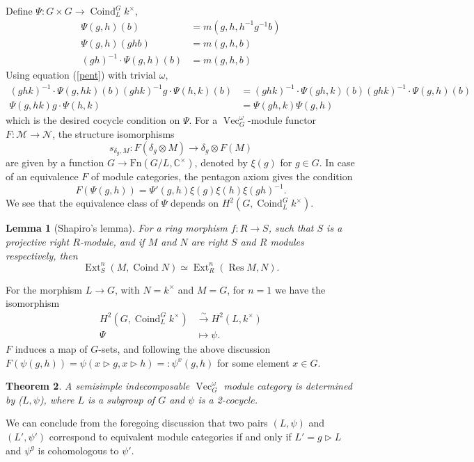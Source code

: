 \documentclass[11pt]{book}
\newtheorem{theorem}{Theorem}[section]
\newtheorem{Lem}[theorem]{Lemma}
\theoremstyle{Rem}
\theoremstyle{definition}
\numberwithin{equation}{section}
\newcommand\hit{\triangleright}
\newcommand\inv{^{-1}}
\newcommand\ot{\otimes}
\newcommand\Res{\operatorname{Res}}
\newcommand\Coind{\operatorname{Coind}}
\newcommand\Vect{\operatorname{Vec}}
\newcommand\Ext{\operatorname{Ext}}
\newcommand\kk{\mathbb C}
\newcommand\M{\mathcal{M}}
\newcommand\NN{\mathcal{N}}
\newcommand{\ra}\rightarrow
\begin{document}
Define $\Psi: G\times G \rightarrow \Coind^G_L k^\times$, 
\begin{align}
	\Psi(g,h)(b) &= m(g, h, h\inv g\inv b) \\
	\Psi(g,h)(ghb) &=  m(g, h, b)\\
	(gh)\inv\cdot\Psi (g,h)(b) &= m(g,h,b)
\end{align}
Using equation (\ref{pent}) with trivial $\omega$,
\begin{align}
	(ghk)\inv\cdot \Psi(g, hk)(b)(ghk)\inv g\cdot \Psi(h, k)( b) &=  (ghk)\inv\cdot \Psi(gh, k)( b)(ghk)\inv \cdot \Psi(g, h)(b)\\
 \Psi(g, hk)g\cdot \Psi(h, k) &=   \Psi(gh, k) \Psi(g, h)
\end{align}
which is the desired cocycle condition on $\Psi$. For a $\Vect^\omega_G$-module functor $F:\M\ra \NN$, the structure isomorphisms \begin{equation}
	s_{\delta_g, M}: F(\delta_g \ot M)\ra \delta_g\ot F(M)
\end{equation} are given by a function $G\ra \text{Fn} (G/L, \kk^\times)$, denoted by $\xi(g)$ for $g\in G$. In case of an equivalence $F$ of module categories, the pentagon axiom gives the condition \begin{equation}
	F(\Psi(g, h))  = \Psi'(g, h) \xi(g)\xi(h)\xi(gh)\inv.
\end{equation} We see that the equivalence class of $\Psi$ depends on $H^2(G, \Coind^G_L k^\times)$.\\
 \begin{Lem}[Shapiro's lemma]For a ring morphism $f:R\rightarrow S$, such that $S$ is a projective right $R$-module, and if $M$ and $N$ are right $S$ and $R$ modules respectively, then 
 \begin{equation}
  	\Ext_S^n(M, \Coind N) \simeq \Ext_R^n (\Res M, N).
  \end{equation} 
 
 \end{Lem}
For the morphism $L\rightarrow G$, with $N=k^\times$ and $M=G$, for $n=1$ we have the isomorphism
\begin{align*}
 	H^2(G, \Coind^G_L k^\times) &\overset{\sim}\longrightarrow H^2(L, k^\times)\\
 	\Psi &\mapsto \psi.
 \end{align*} 
 $F$ induces a map of $G$-sets, and following the above discussion $F(\psi(g, h)) = \psi(x\hit g, x\hit h) =: \psi^x(g, h)$ for some element $x\in G$.
\begin{theorem}\label{simpleparam}
A semisimple indecomposable $\Vect^\omega_G$ module category is determined by ($L,\psi$), where $L$ is a subgroup of $G$ and $\psi$ is a 2-cocycle.
\end{theorem}
We can conclude from the foregoing discussion that two pairs $(L, \psi)$ and $(L', \psi')$ correspond to equivalent module categories if and only if $L' = g\hit L$ and $\psi^g$ is cohomologous to $\psi'$.
\end{document}
